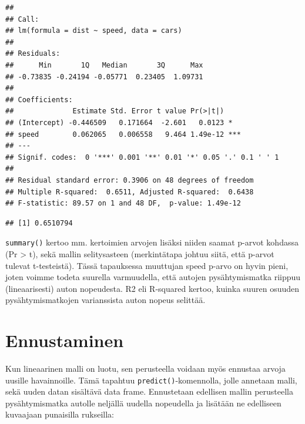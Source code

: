 \documentclass[
]{book}
\newenvironment{Shaded}{\begin{snugshade}}{\end{snugshade}}
\newcommand{\CommentTok}[1]{\textcolor[rgb]{0.56,0.35,0.01}{\textit{#1}}}
\newcommand{\FunctionTok}[1]{\textcolor[rgb]{0.00,0.00,0.00}{#1}}
\newcommand{\NormalTok}[1]{#1}
\newcommand{\OtherTok}[1]{\textcolor[rgb]{0.56,0.35,0.01}{#1}}
\newcommand{\SpecialCharTok}[1]{\textcolor[rgb]{0.00,0.00,0.00}{#1}}
\begin{document}
\begin{verbatim}
## 
## Call:
## lm(formula = dist ~ speed, data = cars)
## 
## Residuals:
##      Min       1Q   Median       3Q      Max 
## -0.73835 -0.24194 -0.05771  0.23405  1.09731 
## 
## Coefficients:
##              Estimate Std. Error t value Pr(>|t|)    
## (Intercept) -0.446509   0.171664  -2.601   0.0123 *  
## speed        0.062065   0.006558   9.464 1.49e-12 ***
## ---
## Signif. codes:  0 '***' 0.001 '**' 0.01 '*' 0.05 '.' 0.1 ' ' 1
## 
## Residual standard error: 0.3906 on 48 degrees of freedom
## Multiple R-squared:  0.6511, Adjusted R-squared:  0.6438 
## F-statistic: 89.57 on 1 and 48 DF,  p-value: 1.49e-12
\end{verbatim}

\begin{Shaded}
\end{Shaded}

\begin{verbatim}
## [1] 0.6510794
\end{verbatim}

\texttt{summary()} kertoo mm. kertoimien arvojen lisäksi niiden saamat p-arvot kohdassa (Pr \textgreater{} \textbar t\textbar), sekä mallin selitysasteen (merkintätapa johtuu siitä, että p-arvot tulevat t-testeistä). Tässä tapauksessa muuttujan speed p-arvo on hyvin pieni, joten voimme todeta suurella varmuudella, että autojen pysähtymismatka riippuu (lineaarisesti) auton nopeudesta. R2 eli R-squared kertoo, kuinka suuren osuuden pysähtymismatkojen varianssista auton nopeus selittää.

\hypertarget{ennustaminen}{%
\section{Ennustaminen}\label{ennustaminen}}

Kun lineaarinen malli on luotu, sen perusteella voidaan myös ennustaa arvoja uusille havainnoille. Tämä tapahtuu \texttt{predict()}-komennolla, jolle annetaan malli, sekä uuden datan sisältävä data frame. Ennustetaan edellisen mallin perusteella pysähtymismatka autolle neljällä uudella nopeudella ja lisätään ne edelliseen kuvaajaan punaisilla rukseilla:
\end{document}
